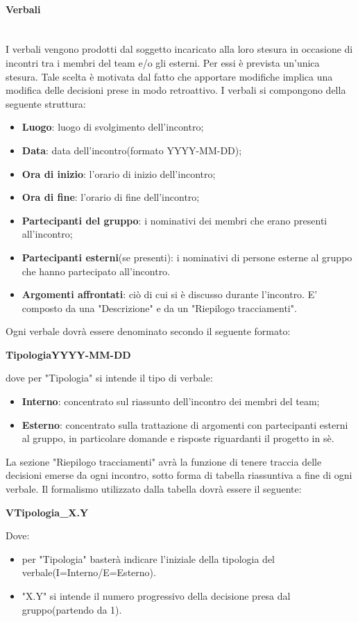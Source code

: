 		\paragraph{Verbali} \mbox{}\\
		I verbali vengono prodotti dal soggetto incaricato alla loro stesura in occasione di incontri tra i membri del team e/o gli esterni. Per essi è prevista un’unica stesura. Tale	scelta è motivata dal fatto che apportare modifiche implica una modifica delle decisioni prese in modo retroattivo.
		I verbali si compongono della seguente struttura:
		\begin{itemize}
			\item \textbf{Luogo}: luogo di svolgimento dell'incontro;
			\item \textbf{Data}: data dell'incontro(formato YYYY-MM-DD);
			\item \textbf{Ora di inizio}: l'orario di inizio dell'incontro;
			\item \textbf{Ora di fine}: l'orario di fine dell'incontro;
			\item \textbf{Partecipanti del gruppo}: i nominativi dei membri che erano presenti all'incontro;
			\item \textbf{Partecipanti esterni}(se presenti): i nominativi di persone esterne al gruppo che hanno partecipato all'incontro.
			\item \textbf{Argomenti affrontati}: ciò di cui si è discusso durante l'incontro. E' composto da una "Descrizione" e da un "Riepilogo tracciamenti".
		\end{itemize}
		Ogni verbale dovrà essere denominato secondo il seguente formato: \newline
		\centerline{\textbf{TipologiaYYYY-MM-DD}} \newline \newline
		dove per "Tipologia" si intende il tipo di verbale:
		\begin{itemize}
			\item \textbf{Interno}: concentrato sul riassunto dell'incontro dei membri del team;
			\item \textbf{Esterno}: concentrato sulla trattazione di argomenti con partecipanti esterni al gruppo, in particolare domande e risposte riguardanti il progetto in sè.
		\end{itemize}
		La sezione "Riepilogo tracciamenti" avrà la funzione di tenere traccia delle decisioni emerse da ogni incontro, sotto forma di tabella riassuntiva a fine di ogni verbale. Il formalismo utilizzato dalla tabella dovrà essere il seguente: \newline
		\centerline{\textbf{VTipologia\_X.Y}} \newline \newline
		Dove:
		\begin{itemize}
			\item per "Tipologia" basterà indicare l'iniziale della tipologia del verbale(I=Interno/E=Esterno).
			\item "X.Y" si intende il numero progressivo della decisione presa dal gruppo(partendo da 1).
		\end{itemize}
